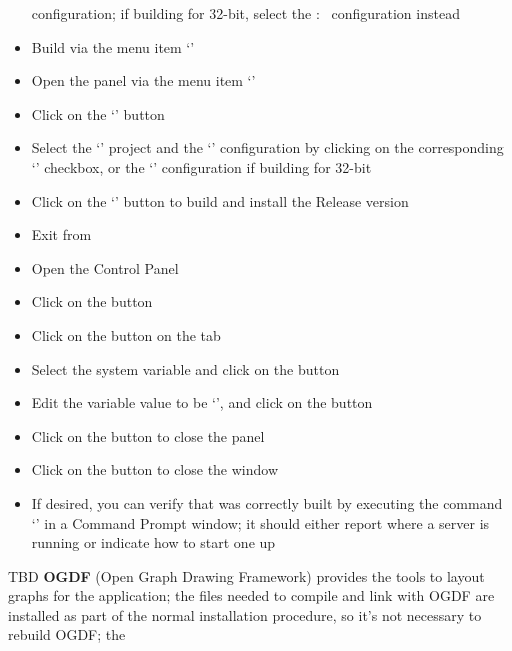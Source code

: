 \begin{itemize}
configuration; if building for 32-bit, select the  :\ 
configuration instead
\item\exSp{}Build via the menu item `'
\item\exSp{}Open the  panel via the menu item
`'
\item\exSp{}Click on the `' button
\item\exSp{}Select the `' project and the `'
configuration by clicking on the corresponding `' checkbox, or the
`' configuration if building for 32-bit
\item\exSp{}Click on the `' button to build and install the Release version
\item\exSp{}Exit from 
\item\exSp{}Open the  Control Panel
\item\exSp{}Click on the  button
\item\exSp{}Click on the  button on the 
tab
\item\exSp{}Select the  system variable and click on the
 button 
\item\exSp{}Edit the variable value to be
`', and click on the 
button
\item\exSp{}Click on the  button to close the 
panel
\item\exSp{}Click on the  button to close the 
window
\item\exSp{}If desired, you can verify that \yarp{} was correctly built by executing the
command `' in a Command Prompt window; it should either report where a
\yarp{} server is running or indicate how to start one up
\end{itemize}
\tertiaryEnd
{}
TBD
\tertiaryEnd
\secondaryEnd
{}
\textbf{OGDF} (Open Graph Drawing Framework) provides the tools to layout graphs for the
\MMMU{} application; the files needed to compile and link with OGDF are installed as part
of the normal \mplusm{} installation procedure, so it's not necessary to rebuild OGDF; the
